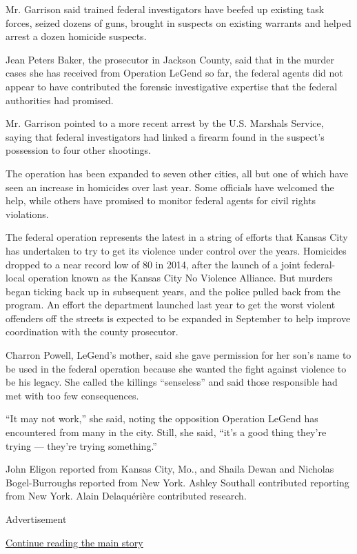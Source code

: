 Mr. Garrison said trained federal investigators have beefed up existing
task forces, seized dozens of guns, brought in suspects on existing
warrants and helped arrest a dozen homicide suspects.

Jean Peters Baker, the prosecutor in Jackson County, said that in the
murder cases she has received from Operation LeGend so far, the federal
agents did not appear to have contributed the forensic investigative
expertise that the federal authorities had promised.

Mr. Garrison pointed to a more recent arrest by the U.S. Marshals
Service, saying that federal investigators had linked a firearm found in
the suspect's possession to four other shootings.

The operation has been expanded to seven other cities, all but one of
which have seen an increase in homicides over last year. Some officials
have welcomed the help, while others have promised to monitor federal
agents for civil rights violations.

The federal operation represents the latest in a string of efforts that
Kansas City has undertaken to try to get its violence under control over
the years. Homicides dropped to a near record low of 80 in 2014, after
the launch of a joint federal-local operation known as the Kansas City
No Violence Alliance. But murders began ticking back up in subsequent
years, and the police pulled back from the program. An effort the
department launched last year to get the worst violent offenders off the
streets is expected to be expanded in September to help improve
coordination with the county prosecutor.

Charron Powell, LeGend's mother, said she gave permission for her son's
name to be used in the federal operation because she wanted the fight
against violence to be his legacy. She called the killings ``senseless''
and said those responsible had met with too few consequences.

``It may not work,'' she said, noting the opposition Operation LeGend
has encountered from many in the city. Still, she said, ``it's a good
thing they're trying --- they're trying something.''

John Eligon reported from Kansas City, Mo., and Shaila Dewan and
Nicholas Bogel-Burroughs reported from New York. Ashley Southall
contributed reporting from New York. Alain Delaquérière contributed
research.

Advertisement

\protect\hyperlink{after-bottom}{Continue reading the main story}

